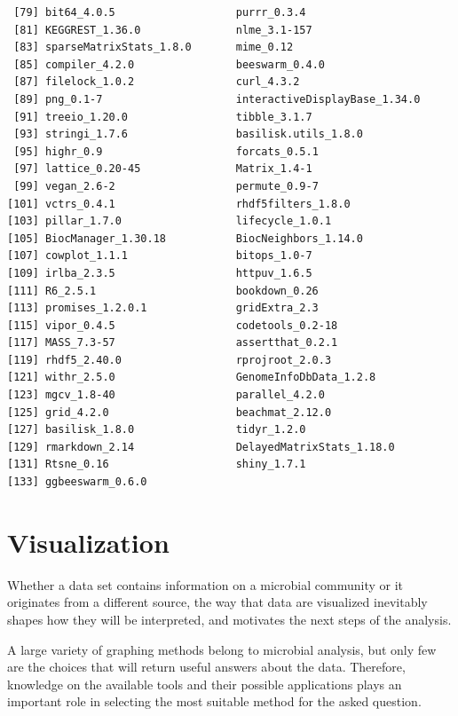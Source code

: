 \documentclass[
]{book}
\begin{document}
\begin{verbatim}
 [79] bit64_4.0.5                   purrr_0.3.4                  
 [81] KEGGREST_1.36.0               nlme_3.1-157                 
 [83] sparseMatrixStats_1.8.0       mime_0.12                    
 [85] compiler_4.2.0                beeswarm_0.4.0               
 [87] filelock_1.0.2                curl_4.3.2                   
 [89] png_0.1-7                     interactiveDisplayBase_1.34.0
 [91] treeio_1.20.0                 tibble_3.1.7                 
 [93] stringi_1.7.6                 basilisk.utils_1.8.0         
 [95] highr_0.9                     forcats_0.5.1                
 [97] lattice_0.20-45               Matrix_1.4-1                 
 [99] vegan_2.6-2                   permute_0.9-7                
[101] vctrs_0.4.1                   rhdf5filters_1.8.0           
[103] pillar_1.7.0                  lifecycle_1.0.1              
[105] BiocManager_1.30.18           BiocNeighbors_1.14.0         
[107] cowplot_1.1.1                 bitops_1.0-7                 
[109] irlba_2.3.5                   httpuv_1.6.5                 
[111] R6_2.5.1                      bookdown_0.26                
[113] promises_1.2.0.1              gridExtra_2.3                
[115] vipor_0.4.5                   codetools_0.2-18             
[117] MASS_7.3-57                   assertthat_0.2.1             
[119] rhdf5_2.40.0                  rprojroot_2.0.3              
[121] withr_2.5.0                   GenomeInfoDbData_1.2.8       
[123] mgcv_1.8-40                   parallel_4.2.0               
[125] grid_4.2.0                    beachmat_2.12.0              
[127] basilisk_1.8.0                tidyr_1.2.0                  
[129] rmarkdown_2.14                DelayedMatrixStats_1.18.0    
[131] Rtsne_0.16                    shiny_1.7.1                  
[133] ggbeeswarm_0.6.0             
\end{verbatim}

\hypertarget{viz-chapter}{%
\chapter{Visualization}\label{viz-chapter}}

Whether a data set contains information on a microbial community or it originates from a different source, the way that data are visualized inevitably shapes how they will be interpreted, and motivates the next steps of the analysis.

A large variety of graphing methods belong to microbial analysis, but only few are the choices that will return useful answers about the data. Therefore, knowledge on the available tools and their possible applications plays an important role in selecting the most suitable method for the asked question.
\end{document}
